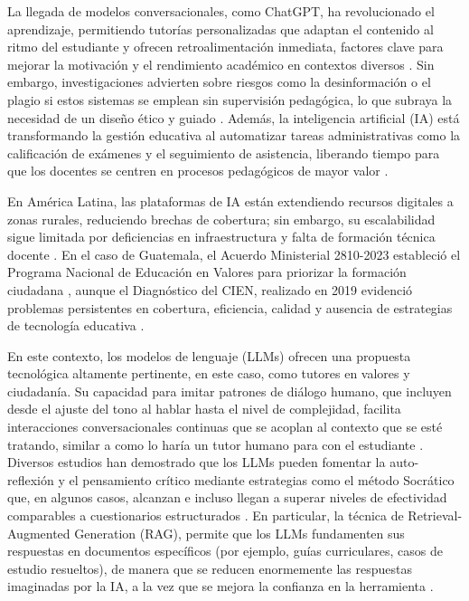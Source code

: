 La llegada de modelos conversacionales, como ChatGPT, ha revolucionado el aprendizaje, permitiendo tutorías personalizadas que adaptan el contenido al ritmo del estudiante y ofrecen retroalimentación inmediata, factores clave para mejorar la motivación y el rendimiento académico en contextos diversos \cite{frontiers2024chatgpt}. Sin embargo, investigaciones advierten sobre riesgos como la desinformación o el plagio si estos sistemas se emplean sin supervisión pedagógica, lo que subraya la necesidad de un diseño ético y guiado \cite{tulsiani2024chatgpt}. Además, la inteligencia artificial (IA) está transformando la gestión educativa al automatizar tareas administrativas como la calificación de exámenes y el seguimiento de asistencia, liberando tiempo para que los docentes se centren en procesos pedagógicos de mayor valor \cite{unesco2023monitoring}.

En América Latina, las plataformas de IA están extendiendo recursos digitales a zonas rurales, reduciendo brechas de cobertura; sin embargo, su escalabilidad sigue limitada por deficiencias en infraestructura y falta de formación técnica docente \cite{worldbank2022revolution,rivas2023future}. En el caso de Guatemala, el Acuerdo Ministerial 2810-2023 estableció el Programa Nacional de Educación en Valores para priorizar la formación ciudadana \cite{mineduc2023acuerdo}, aunque el Diagnóstico del CIEN, realizado en 2019 evidenció problemas persistentes en cobertura, eficiencia, calidad y ausencia de estrategias de tecnología educativa \cite{cien2019diagnostico}.

En este contexto, los modelos de lenguaje (LLMs) ofrecen una propuesta tecnológica altamente pertinente, en este caso, como tutores en valores y ciudadanía. Su capacidad para imitar patrones de diálogo humano, que incluyen desde el ajuste del tono al hablar hasta el nivel de complejidad, facilita interacciones conversacionales continuas que se acoplan al contexto que se esté tratando, similar a como lo haría un tutor humano para con el estudiante \cite{qin2024transforming}. Diversos estudios han demostrado que los LLMs pueden fomentar la auto-reflexión y el pensamiento crítico mediante estrategias como el método Socrático que, en algunos casos, alcanzan e incluso llegan a superar niveles de efectividad comparables a cuestionarios estructurados \cite{cordova2025aiagents}. En particular, la técnica de Retrieval-Augmented Generation (RAG), permite que los LLMs fundamenten sus respuestas en documentos específicos (por ejemplo, guías curriculares, casos de estudio resueltos), de manera que se reducen enormemente las respuestas imaginadas por la IA, a la vez que se mejora la confianza en la herramienta \cite{cordova2025aiagents,levonian2025safechats}.


